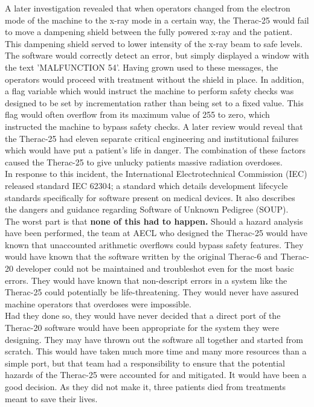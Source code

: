 \documentclass{article}
\begin{document}
A later investigation revealed that when operators changed from the electron mode of the machine to the x-ray mode in a certain way, the Therac-25 would fail to move a dampening shield between the fully powered x-ray and the patient. This dampening shield served to lower intensity of the x-ray beam to safe levels. The software would correctly detect an error, but simply displayed a window with the text 'MALFUNCTION 54'. Having grown used to these messages, the operators would proceed with treatment without the shield in place. In addition, a flag variable which would instruct the machine to perform safety checks was designed to be set by incrementation rather than being set to a fixed value. This flag would often overflow from its maximum value of 255 to zero, which instructed the machine to bypass safety checks. A later review would reveal that the Therac-25 had eleven separate critical engineering and institutional failures which would have put a patient's life in danger. The combination of these factors caused the Therac-25 to give unlucky patients massive radiation overdoses.\\

In response to this incident, the International Electrotechnical Commission (IEC) released standard IEC 62304; a standard which details development lifecycle standards specifically for software present on medical devices. It also describes the dangers and guidance regarding Software of Unknown Pedigree (SOUP).\\

The worst part is that \textbf{none of this had to happen.} Should a hazard analysis have been performed, the team at AECL who designed the Therac-25 would have known that unaccounted arithmetic overflows could bypass safety features. They would have known that the software written by the original Therac-6 and Therac-20 developer could not be maintained and troubleshot even for the most basic errors. They would have known that non-descript errors in a system like the Therac-25 could potentially be life-threatening. They would never have assured machine operators that overdoses were impossible. \\

Had they done so, they would have never decided that a direct port of the Therac-20 software would have been appropriate for the system they were designing. They may have thrown out the software all together and started from scratch. This would have taken much more time and many more resources than a simple port, but that team had a responsibility to ensure that the potential hazards of the Therac-25 were accounted for and mitigated. It would have been a good decision. As they did not make it, three patients died from treatments meant to save their lives.\cite{rose_1994}\\
\end{document}
